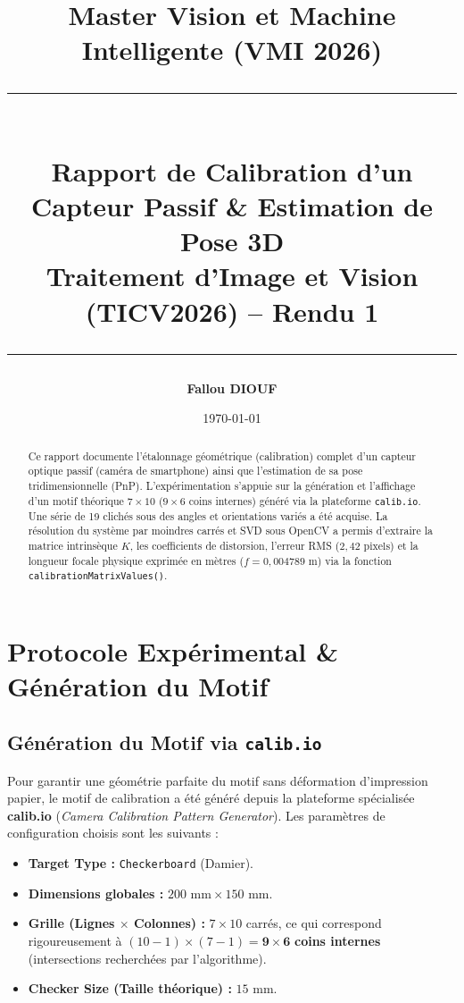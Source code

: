 \documentclass[11pt,a4paper]{article}
\title{
    \vspace{-1cm}
    \textbf{\Large Master Vision et Machine Intelligente (VMI 2026)}\\
    \rule{\linewidth}{1pt}\\[0.3cm]
    \Huge \textbf{Rapport de Calibration d'un Capteur Passif \& Estimation de Pose 3D}\\[0.2cm]
    \large Traitement d'Image et Vision (TICV2026) -- Rendu 1
    \rule{\linewidth}{1pt}
}
\author{\textbf{Fallou DIOUF}}
\date{\today}
\begin{document}
\maketitle

\begin{abstract}
\noindent Ce rapport documente l'étalonnage géométrique (calibration) complet d'un capteur optique passif (caméra de smartphone) ainsi que l'estimation de sa pose tridimensionnelle (PnP). L'expérimentation s'appuie sur la génération et l'affichage d'un motif théorique $7 \times 10$ ($9 \times 6$ coins internes) généré via la plateforme \texttt{calib.io}. Une série de 19 clichés sous des angles et orientations variés a été acquise. La résolution du système par moindres carrés et SVD sous OpenCV a permis d'extraire la matrice intrinsèque $K$, les coefficients de distorsion, l'erreur RMS ($2{,}42\text{ pixels}$) et la longueur focale physique exprimée en mètres ($f = 0{,}004789\text{ m}$) via la fonction \texttt{calibrationMatrixValues()}.
\end{abstract}

\vspace{0.5cm}

\section{Protocole Expérimental \& Génération du Motif}

\subsection{Génération du Motif via \texttt{calib.io}}
Pour garantir une géométrie parfaite du motif sans déformation d'impression papier, le motif de calibration a été généré depuis la plateforme spécialisée \textbf{calib.io} (\textit{Camera Calibration Pattern Generator}). Les paramètres de configuration choisis sont les suivants :
\begin{itemize}
    \item \textbf{Target Type :} \texttt{Checkerboard} (Damier).
    \item \textbf{Dimensions globales :} $200\text{ mm} \times 150\text{ mm}$.
    \item \textbf{Grille (Lignes $\times$ Colonnes) :} $7 \times 10$ carrés, ce qui correspond rigoureusement à $(10-1) \times (7-1) = \mathbf{9 \times 6}$ \textbf{coins internes} (intersections recherchées par l'algorithme).
    \item \textbf{Checker Size (Taille théorique) :} $15\text{ mm}$.
\end{itemize}
\end{document}
